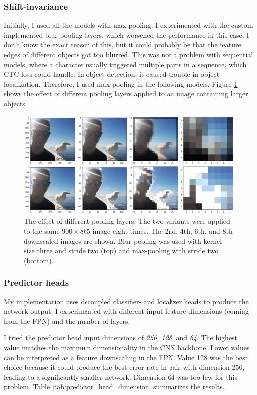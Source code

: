 \subsubsection{Shift-invariance}

Initially, I used all the models with max-pooling. I experimented with the custom implemented blur-pooling layers, which worsened the performance in this case. I don't know the exact reason of this, but it could probably be that the feature edges of different objects got too blurred. This was not a problem with sequential models, where a character usually triggered multiple parts in a sequence, which CTC loss could handle. In object detection, it caused trouble in object localization. Therefore, I used max-pooling in the following models. Figure \ref{fig:blur_vs_max_pool} shows the effect of different pooling layers applied to an image containing larger objects.

\begin{figure}[htb]
 \centerline{\includegraphics[width=1.0\columnwidth]{.//Figure/OCR/blur_vs_max_pool.png}}
 \caption{The effect of different pooling layers. The two variants were applied to the same $900\times865$ image eight times. The 2nd, 4th, 6th, and 8th downscaled images are shown. Blur-pooling was used with kernel size three and stride two (top) and max-pooling with stride two (bottom).}
 \label{fig:blur_vs_max_pool}
\end{figure}

\subsubsection{Predictor heads}

My implementation uses decoupled classifier- and localizer heads to produce the network output. I experimented with different input feature dimensions (coming from the FPN) and the number of layers.

I tried the predictor head input dimensions of \textit{256, 128}, and \textit{64}. The highest value matches the maximum dimensionality in the CNN backbone. Lower values can be interpreted as a feature downscaling in the FPN. Value 128 was the best choice because it could produce the best error rate in pair with dimension 256, leading to a significantly smaller network. Dimension 64 was too few for this problem. Table \ref{tab:predictor_head_dimension} summarizes the results.

